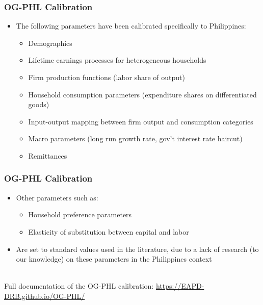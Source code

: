\documentclass{beamer}
\begin{document}
\begin{frame}
  \frametitle{OG-PHL Calibration}
  \begin{itemize}
    \item The following parameters have been calibrated specifically to Philippines:
      \begin{itemize}
          \item Demographics
          \item Lifetime earnings processes for heterogeneous households
          \item Firm production functions (labor share of output)
          \item Household consumption parameters (expenditure shares on differentiated goods)
          \item Input-output mapping between firm output and consumption categories
          \item Macro parameters (long run growth rate, gov't interest rate haircut)
          \item Remittances
      \end{itemize}
  \end{itemize}
\end{frame}

\begin{frame}
  \frametitle{OG-PHL Calibration}
  \begin{itemize}
    \item Other parameters such as:
      \begin{itemize}
          \item Household preference parameters
          \item Elasticity of substitution between capital and labor
      \end{itemize}
    \item Are set to standard values used in the literature, due to a lack of research (to our knowledge) on these parameters in the Philippines context
  \end{itemize}
\ \\
  Full documentation of the OG-PHL calibration: \href{https://EAPD-DRB.github.io/OG-PHL/}{https://EAPD-DRB.github.io/OG-PHL/}
\end{frame}
\end{document}
